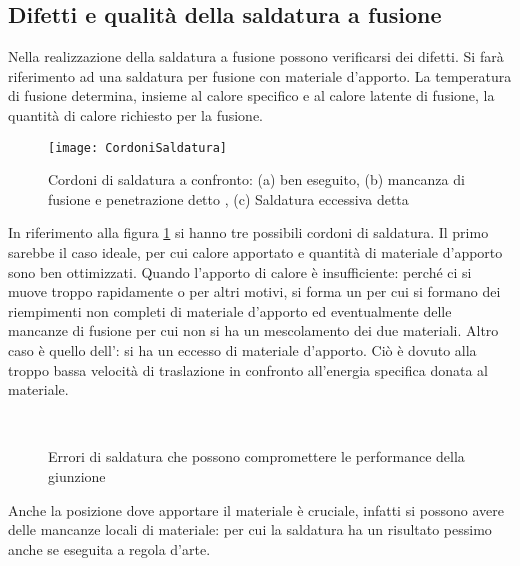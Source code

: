 \subsection{Difetti e qualità della saldatura a fusione}
Nella realizzazione della saldatura a fusione possono verificarsi dei difetti.
Si farà riferimento ad una saldatura per fusione con materiale d'apporto.
La temperatura di fusione determina, insieme al calore specifico e al calore latente di fusione, la quantità di calore richiesto per la fusione.
\begin{figure}
\centering
\texttt{[image: CordoniSaldatura]}
\caption{Cordoni di saldatura a confronto: (a) ben eseguito, (b) mancanza di fusione e penetrazione detto , (c) Saldatura eccessiva detta }
\label{fig:CordoniSaldatura}
\end{figure}
In riferimento alla figura \ref{fig:CordoniSaldatura} si hanno tre possibili cordoni di saldatura.
Il primo sarebbe il caso ideale, per cui calore apportato e quantità di materiale d'apporto sono ben ottimizzati.
Quando l'apporto di calore è insufficiente: perché ci si muove troppo rapidamente o per altri motivi, si forma un  per cui si formano dei riempimenti non completi di materiale d'apporto ed eventualmente delle mancanze di fusione per cui non si ha un mescolamento dei due materiali.
Altro caso è quello dell': si ha un eccesso di materiale d'apporto. Ciò è dovuto alla troppo bassa velocità di traslazione in confronto all'energia specifica donata al materiale.
\begin{figure}
\centering
{}\\
\caption{Errori di saldatura che possono compromettere le performance della giunzione}
\label{fig:WeldErrors}
\end{figure}

Anche la posizione dove apportare il materiale è cruciale, infatti si possono avere delle mancanze locali di materiale: per cui la saldatura ha un risultato pessimo anche se eseguita a regola d'arte.

